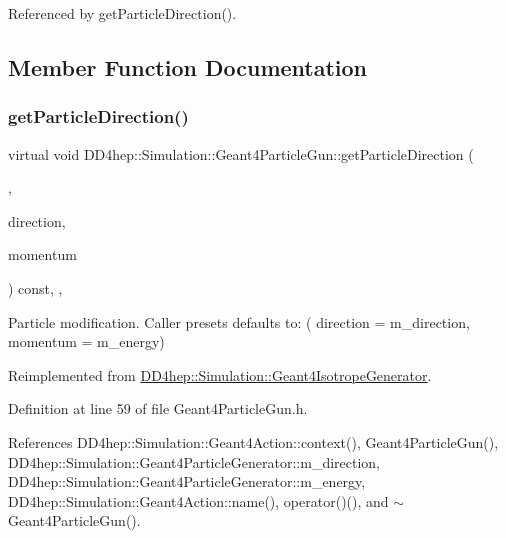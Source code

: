 Referenced by get\+Particle\+Direction().



\subsection{Member Function Documentation}
\hypertarget{class_d_d4hep_1_1_simulation_1_1_geant4_particle_gun_a442d44c1db6bfe109a1c129859900e55}{}\label{class_d_d4hep_1_1_simulation_1_1_geant4_particle_gun_a442d44c1db6bfe109a1c129859900e55} 
\subsubsection{\texorpdfstring{get\+Particle\+Direction()}{getParticleDirection()}}
{\footnotesize\ttfamily virtual void D\+D4hep\+::\+Simulation\+::\+Geant4\+Particle\+Gun\+::get\+Particle\+Direction (\begin{DoxyParamCaption}\item[{int}]{,  }\item[{R\+O\+O\+T\+::\+Math\+::\+X\+Y\+Z\+Vector \&}]{direction,  }\item[{double \&}]{momentum }\end{DoxyParamCaption}) const\hspace{0.3cm}{\ttfamily [inline]}, {\ttfamily [protected]}, {\ttfamily [virtual]}}



Particle modification. Caller presets defaults to\+: ( direction = m\+\_\+direction, momentum = m\+\_\+energy) 



Reimplemented from \hyperlink{class_d_d4hep_1_1_simulation_1_1_geant4_isotrope_generator_a6073247e3b5c587af44fcfb92fac6849}{D\+D4hep\+::\+Simulation\+::\+Geant4\+Isotrope\+Generator}.



Definition at line 59 of file Geant4\+Particle\+Gun.\+h.



References D\+D4hep\+::\+Simulation\+::\+Geant4\+Action\+::context(), Geant4\+Particle\+Gun(), D\+D4hep\+::\+Simulation\+::\+Geant4\+Particle\+Generator\+::m\+\_\+direction, D\+D4hep\+::\+Simulation\+::\+Geant4\+Particle\+Generator\+::m\+\_\+energy, D\+D4hep\+::\+Simulation\+::\+Geant4\+Action\+::name(), operator()(), and $\sim$\+Geant4\+Particle\+Gun().

